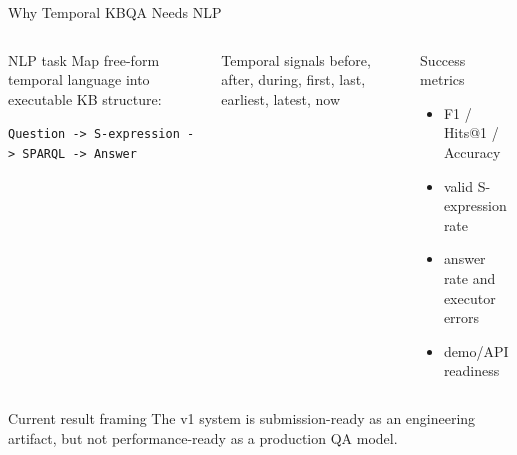 \begin{frame}[shrink=20]{Why Temporal KBQA Needs NLP}
  \begin{columns}[T]
    \begin{block}{NLP task}
      Map free-form temporal language into executable KB structure:
      \begin{center}
        \scriptsize\texttt{Question -> S-expression -> SPARQL -> Answer}
      \end{center}
    \end{block}
    \begin{exampleblock}{Temporal signals}
      \small before, after, during, first, last, earliest, latest, now
    \end{exampleblock}
    \begin{block}{Success metrics}
      \small
      \begin{itemize}
        \item F1 / Hits@1 / Accuracy
        \item valid S-expression rate
        \item answer rate and executor errors
        \item demo/API readiness
      \end{itemize}
    \end{block}
  \end{columns}
  \vspace{0.15cm}
  \begin{alertblock}{Current result framing}
    The v1 system is submission-ready as an engineering artifact, but not performance-ready as a production QA model.
  \end{alertblock}
\end{frame}

